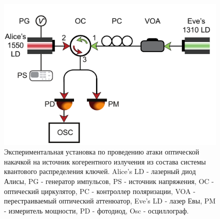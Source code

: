 \begin{figure}
    \centering
    \includegraphics{images/1310 experiment (3).pdf}
    \caption{Экспериментальная установка по проведению атаки оптической накачкой на источник когерентного излучения из состава системы квантового распределения ключей. Alice's LD - лазерный диод Алисы, PG - генератор импульсов, PS - источник напряжения, OC - оптический циркулятор, PC - контроллер поляризации, VOA - перестраиваемый оптический аттенюатор, Eve's LD - лазер Евы, PM - измеритель мощности, PD - фотодиод, Osc - осциллограф. \cite{fadeev2025}}
    \label{fig:ch4 1310 exp}
\end{figure}
